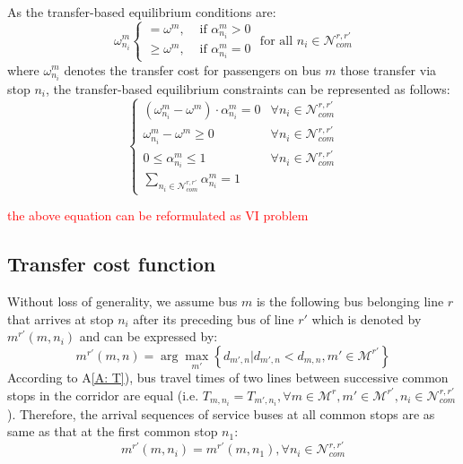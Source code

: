 \documentclass[smallextended]{svjour3}       %
\begin{document}
\begin{Abstract}
As the transfer-based equilibrium conditions are:
\begin{equation}
    \omega_{n_{i}}^{m}
    \begin{cases}
        =\omega^{m},&\text{ if } \alpha_{n_{i}}^{m}>0\\
        \geq \omega^{m},&\text{ if } \alpha_{n_{i}}^{m}=0
    \end{cases}
    \text{ for all } n_{i} \in \mathcal{N}_{com}^{r,r'}
\end{equation}
where $\omega_{n_{i}}^{m}$ denotes the transfer cost for passengers on bus $m$ those transfer via stop $n_{i}$,
the transfer-based equilibrium constraints can be represented as follows:
\begin{equation}
    \begin{cases}
        \left(\omega_{n_{i}}^{m}-\omega^{m}\right)\cdot \alpha_{n_{i}}^{m} = 0 &\forall n_{i}\in \mathcal{N}_{com}^{r,r'}\\
        \omega_{n_{i}}^{m}-\omega^{m} \geq 0 &\forall n_{i}\in \mathcal{N}_{com}^{r,r'}\\
        0 \leq \alpha_{n_{i}}^{m} \leq 1 &\forall n_{i}\in \mathcal{N}_{com}^{r,r'}\\
        \sum\limits_{n_{i}\in \mathcal{N}_{com}^{r,r'}} \alpha_{n_{i}}^{m} = 1
    \end{cases}
\end{equation}

\textcolor{red}{the above equation can be reformulated as VI problem}

\subsection{Transfer cost function}
Without loss of generality, we assume bus $m$ is the following bus belonging line $r$ that arrives at stop $n_{i}$ 
after its preceding bus of line $r'$ which is denoted by $m^{r'}(m,n_{i})$ and can be expressed by: 
\begin{equation}
    m^{r'}\left(m,n\right)=\arg \max_{m'} \left\{d_{m',n} | d_{m',n} < d_{m,n},m'\in\mathcal{M}^{r'}\right\}
\end{equation}
According to A\ref{A: T}), bus travel times of two lines between successive common stops in the corridor are equal 
(i.e. $T_{m,n_{i}}=T_{m',n_{i}},\forall m\in\mathcal{M}^{r},m'\in\mathcal{M}^{r'},n_{i}\in \mathcal{N}_{com}^{r,r'}$).
Therefore, the arrival sequences of service buses at all common stops are as same as that at the first common stop $n_{1}$:
\begin{equation}
    m^{r'}\left(m,n_{i}\right)=m^{r'}\left(m,n_{1}\right), \forall n_{i} \in \mathcal{N}_{com}^{r,r'}
\end{equation} 


\end{Abstract}
\end{document}
